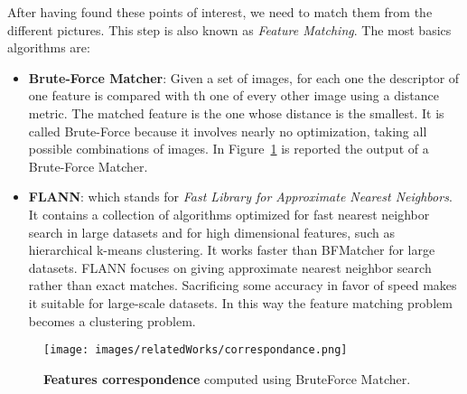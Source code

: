 After having found these points of interest, we need to match them from the different pictures. This step is also known
as \textit{Feature Matching}. The most basics algorithms are:
\begin{itemize}
    \item \textbf{Brute-Force Matcher}: Given a set of images, for each one the descriptor of one feature is compared with th one of every other image using a distance metric.
            The matched feature is the one whose distance is the smallest. It is called Brute-Force because it involves nearly no optimization, taking all possible combinations
            of images. In Figure~\ref{fig:politoCorresponance} is reported the output of a Brute-Force Matcher.
    \item \textbf{FLANN}: which stands for \textit{Fast Library for Approximate Nearest Neighbors}. It contains a collection of algorithms optimized
     for fast nearest neighbor search in large datasets and for high dimensional features, such as hierarchical k-means clustering. It works faster than BFMatcher for large datasets.
     FLANN focuses on giving approximate nearest neighbor search rather than exact matches. Sacrificing some accuracy in favor of speed makes it suitable for large-scale datasets.
     In this way the feature matching problem becomes a clustering problem.

\end{itemize}

\begin{figure}
    \centering
    \texttt{[image: images/relatedWorks/correspondance.png]} %
    \caption{\textbf{Features correspondence} computed using BruteForce Matcher.}
    \label{fig:politoCorresponance}
\end{figure}


